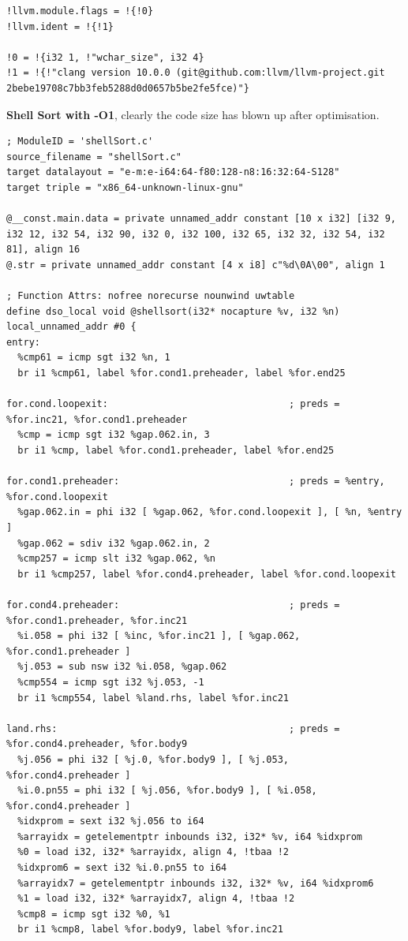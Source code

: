 \documentclass[12pt]{article}
\begin{document}
\begin{itemize}
\begin{lstlisting}[style=CStyle]
!llvm.module.flags = !{!0}
!llvm.ident = !{!1}

!0 = !{i32 1, !"wchar_size", i32 4}
!1 = !{!"clang version 10.0.0 (git@github.com:llvm/llvm-project.git 2bebe19708c7bb3feb5288d0d0657b5be2fe5fce)"}
\end{lstlisting}
\newpage
\textbf{Shell Sort with -O1}, clearly the code size has blown up after optimisation.
\begin{lstlisting}[style=CStyle]
; ModuleID = 'shellSort.c'
source_filename = "shellSort.c"
target datalayout = "e-m:e-i64:64-f80:128-n8:16:32:64-S128"
target triple = "x86_64-unknown-linux-gnu"

@__const.main.data = private unnamed_addr constant [10 x i32] [i32 9, i32 12, i32 54, i32 90, i32 0, i32 100, i32 65, i32 32, i32 54, i32 81], align 16
@.str = private unnamed_addr constant [4 x i8] c"%d\0A\00", align 1

; Function Attrs: nofree norecurse nounwind uwtable
define dso_local void @shellsort(i32* nocapture %v, i32 %n) local_unnamed_addr #0 {
entry:
  %cmp61 = icmp sgt i32 %n, 1
  br i1 %cmp61, label %for.cond1.preheader, label %for.end25

for.cond.loopexit:                                ; preds = %for.inc21, %for.cond1.preheader
  %cmp = icmp sgt i32 %gap.062.in, 3
  br i1 %cmp, label %for.cond1.preheader, label %for.end25

for.cond1.preheader:                              ; preds = %entry, %for.cond.loopexit
  %gap.062.in = phi i32 [ %gap.062, %for.cond.loopexit ], [ %n, %entry ]
  %gap.062 = sdiv i32 %gap.062.in, 2
  %cmp257 = icmp slt i32 %gap.062, %n
  br i1 %cmp257, label %for.cond4.preheader, label %for.cond.loopexit

for.cond4.preheader:                              ; preds = %for.cond1.preheader, %for.inc21
  %i.058 = phi i32 [ %inc, %for.inc21 ], [ %gap.062, %for.cond1.preheader ]
  %j.053 = sub nsw i32 %i.058, %gap.062
  %cmp554 = icmp sgt i32 %j.053, -1
  br i1 %cmp554, label %land.rhs, label %for.inc21

land.rhs:                                         ; preds = %for.cond4.preheader, %for.body9
  %j.056 = phi i32 [ %j.0, %for.body9 ], [ %j.053, %for.cond4.preheader ]
  %i.0.pn55 = phi i32 [ %j.056, %for.body9 ], [ %i.058, %for.cond4.preheader ]
  %idxprom = sext i32 %j.056 to i64
  %arrayidx = getelementptr inbounds i32, i32* %v, i64 %idxprom
  %0 = load i32, i32* %arrayidx, align 4, !tbaa !2
  %idxprom6 = sext i32 %i.0.pn55 to i64
  %arrayidx7 = getelementptr inbounds i32, i32* %v, i64 %idxprom6
  %1 = load i32, i32* %arrayidx7, align 4, !tbaa !2
  %cmp8 = icmp sgt i32 %0, %1
  br i1 %cmp8, label %for.body9, label %for.inc21


\end{lstlisting}
\end{itemize}
\end{document}
